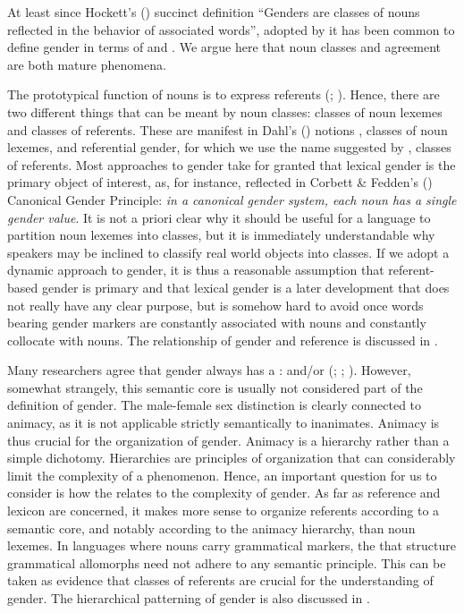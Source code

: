 \documentclass[output=collectionpaper]{langsci/langscibook}
\begin{document}
At least since Hockett's (\citeyear[231]{Hockett1958}) succinct definition \textendash{} ``Genders are classes of nouns reflected in the behavior of associated words'', adopted by \citet{Corbett1991} \textendash{} it has been common to define gender in terms of  and . We argue here that noun classes and agreement are both mature phenomena.

The prototypical function of nouns is to express referents (\citealt[438]{Croft2005}; \citealt{Baker2003}). Hence, there are two different things that can be meant by noun classes: classes of noun lexemes and classes of referents. These are manifest in Dahl's (\citeyear[107]{Dahl2000a}) notions , classes of noun lexemes, and referential gender, for which we use the name  suggested by , classes of referents. Most approaches to gender take for granted that lexical gender is the primary object of interest, as, for instance, reflected in Corbett \& Fedden's (\citeyear[9]{Corbett2016}) Canonical Gender Principle: \emph{in a canonical gender system, each noun has a single gender value}. It is not a priori clear why it should be useful for a language to partition noun lexemes into classes, but it is immediately understandable why speakers may be inclined to classify real world objects into classes. If we adopt a dynamic approach to gender, it is thus a reasonable assumption that referent-based gender is primary and that lexical gender is a later development that does not really have any clear purpose, but is somehow hard to avoid once words bearing gender markers are constantly associated with nouns and constantly collocate with nouns. The relationship of gender and reference is discussed in .

\largerpage
Many researchers agree that gender always has a :  and/or  (\citealt[101]{Dahl2000a}; \citealt[68]{Corbett1991}; \citealt{Luraghi2011}). However, somewhat strangely, this semantic core is usually not considered part of the definition of gender. The male-female sex distinction is clearly connected to animacy, as it is not applicable strictly semantically to inanimates. Animacy is thus crucial for the organization of gender. Animacy is a hierarchy rather than a simple dichotomy. Hierarchies are principles of organization that can considerably limit the complexity of a phenomenon. Hence, an important question for us to consider is how the  relates to the complexity of gender. As far as reference and lexicon are concerned, it makes more sense to organize referents according to a semantic core, and notably according to the animacy hierarchy, than noun lexemes. In languages where nouns carry grammatical markers, the  that structure grammatical allomorphs need not adhere to any semantic principle. This can be taken as evidence that classes of referents are crucial for the understanding of gender. The hierarchical patterning of gender is also discussed in .
\end{document}
